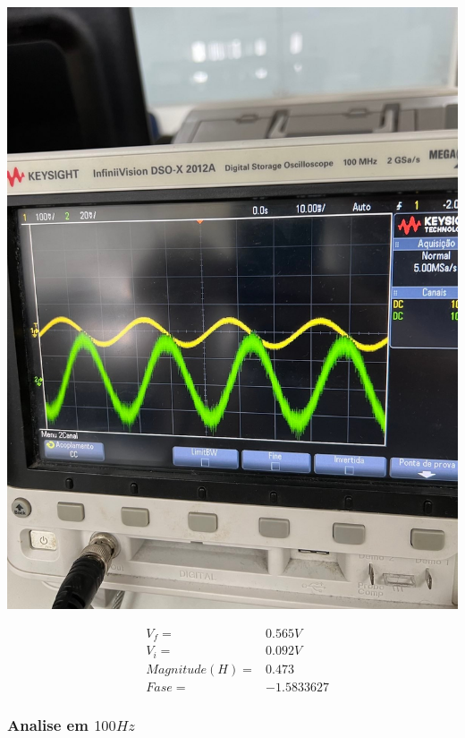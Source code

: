 \documentclass[12pt,twoside, a4paper, twocolumn]{article}
\begin{document}
\begin{adjustbox}{scale=0.18}
    \includegraphics{freq40.jpeg}
\end{adjustbox}


\begin{equation*}
    \begin{aligned}
         & V_f =          & 0.565V     \\
         & V_i =          & 0.092V     \\
         & Magnitude(H) = & 0.473      \\
         & Fase =         & -1.5833627
    \end{aligned}
\end{equation*}




\subsubsection{Analise em $100Hz$}
\subparagraph*{}
\end{document}
